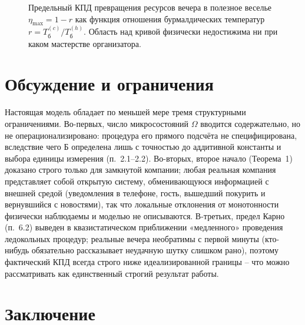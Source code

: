 \documentclass[11pt,a4paper]{article}
\newcommand{\Burm}{\text{Б}}
\newcommand{\Tb}{T_{\text{б}}}
\begin{document}
\begin{figure}[htbp]
\centering
{}
\caption{Предельный КПД превращения ресурсов вечера в полезное веселье $\eta_{\max}=1-r$ как функция отношения бурмалдических температур $r=\Tb^{(c)}/\Tb^{(h)}$. Область над кривой физически недостижима ни при каком мастерстве организатора.}
\label{fig:carnot}
\end{figure}

\section{Обсуждение и ограничения}

Настоящая модель обладает по меньшей мере тремя структурными ограничениями. Во-первых, число микросостояний $\Omega$ вводится содержательно, но не операционализировано: процедура его прямого подсчёта не специфицирована, вследствие чего $\Burm$ определена лишь с точностью до аддитивной константы и выбора единицы измерения (п.~2.1--2.2). Во-вторых, второе начало (Теорема~1) доказано строго только для замкнутой компании; любая реальная компания представляет собой открытую систему, обменивающуюся информацией с внешней средой (уведомления в телефоне, гость, вышедший покурить и вернувшийся с новостями), так что локальные отклонения от монотонности физически наблюдаемы и моделью не описываются. В-третьих, предел Карно (п.~6.2) выведен в квазистатическом приближении «медленного» проведения ледокольных процедур; реальные вечера необратимы с первой минуты (кто-нибудь обязательно рассказывает неудачную шутку слишком рано), поэтому фактический КПД всегда строго ниже идеализированной границы -- что можно рассматривать как единственный строгий результат работы.

\section{Заключение}
\end{document}
